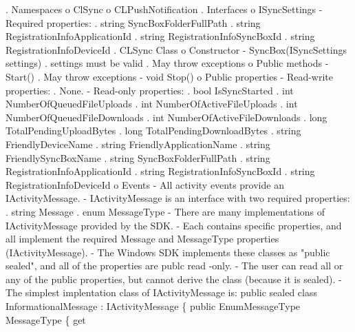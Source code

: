 
\begin{DoxyCode}
. Namespaces
  o ClSync
  o CLPushNotification
. Interfaces
  o ISyncSettings
    - Required properties:
      . \textcolor{keywordtype}{string} SyncBoxFolderFullPath
      . \textcolor{keywordtype}{string} RegistrationInfoApplicationId
      . \textcolor{keywordtype}{string} RegistrationInfoSyncBoxId
      . \textcolor{keywordtype}{string} RegistrationInfoDeviceId
. CLSync Class
  o Constructor
    - SyncBox(ISyncSettings settings)
      . settings must be valid
      . May \textcolor{keywordflow}{throw} exceptions
  o Public methods
    - Start()
      . May \textcolor{keywordflow}{throw} exceptions
    - \textcolor{keywordtype}{void} Stop()
  o Public properties
    - Read-write properties:
      . None.
    - Read-only properties:
      . \textcolor{keywordtype}{bool} IsSyncStarted
      . \textcolor{keywordtype}{int} NumberOfQueuedFileUploads
      . \textcolor{keywordtype}{int} NumberOfActiveFileUploads
      . \textcolor{keywordtype}{int} NumberOfQueuedFileDownloads
      . \textcolor{keywordtype}{int} NumberOfActiveFileDownloads
      . \textcolor{keywordtype}{long} TotalPendingUploadBytes
      . \textcolor{keywordtype}{long} TotalPendingDownloadBytes
      . \textcolor{keywordtype}{string} FriendlyDeviceName
      . \textcolor{keywordtype}{string} FriendlyApplicationName
      . \textcolor{keywordtype}{string} FriendlySyncBoxName
      . \textcolor{keywordtype}{string} SyncBoxFolderFullPath
      . \textcolor{keywordtype}{string} RegistrationInfoApplicationId
      . \textcolor{keywordtype}{string} RegistrationInfoSyncBoxId
      . \textcolor{keywordtype}{string} RegistrationInfoDeviceId
  o Events
    - All activity events provide an IActivityMessage.
    - IActivityMessage is an interface with two required properties: 
      . \textcolor{keywordtype}{string} Message
      . enum MessageType
    - There are many implementations of IActivityMessage provided by the SDK.
    - Each contains specific properties, and all implement the required Message and MessageType properties 
      (IActivityMessage).
    - The Windows SDK implements these classes as "public sealed", and all of the properties are publc read
      -only.
    - The user can read all or any of the public properties, but cannot derive the class (because it is 
      sealed).
    - The simplest implentation class of IActivityMessage is:
          public sealed class InformationalMessage : IActivityMessage
          \{
              \textcolor{keyword}{public} EnumMessageType MessageType 
              \{
                  \textcolor{keyword}{get}

\end{DoxyCode}
